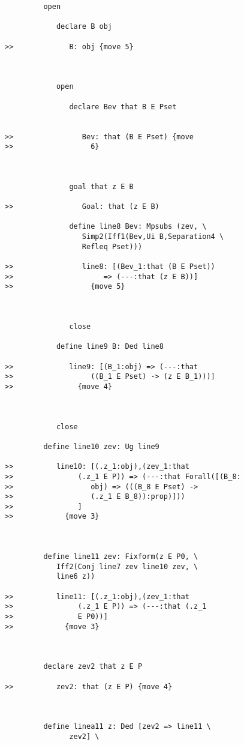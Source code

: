 \documentclass[12pt]{article}
\begin{document}
\begin{verbatim}
         open

            declare B obj

>>             B: obj {move 5}



            open

               declare Bev that B E Pset


>>                Bev: that (B E Pset) {move
>>                  6}



               goal that z E B

>>                Goal: that (z E B)

               define line8 Bev: Mpsubs (zev, \
                  Simp2(Iff1(Bev,Ui B,Separation4 \
                  Refleq Pset)))

>>                line8: [(Bev_1:that (B E Pset))
>>                     => (---:that (z E B))]
>>                  {move 5}



               close

            define line9 B: Ded line8

>>             line9: [(B_1:obj) => (---:that
>>                  ((B_1 E Pset) -> (z E B_1)))]
>>               {move 4}



            close

         define line10 zev: Ug line9

>>          line10: [(.z_1:obj),(zev_1:that
>>               (.z_1 E P)) => (---:that Forall([(B_8:
>>                  obj) => (((B_8 E Pset) ->
>>                  (.z_1 E B_8)):prop)]))
>>               ]
>>            {move 3}



         define line11 zev: Fixform(z E P0, \
            Iff2(Conj line7 zev line10 zev, \
            line6 z))

>>          line11: [(.z_1:obj),(zev_1:that
>>               (.z_1 E P)) => (---:that (.z_1
>>               E P0))]
>>            {move 3}



         declare zev2 that z E P

>>          zev2: that (z E P) {move 4}



         define linea11 z: Ded [zev2 => line11 \
               zev2] \
            




\end{verbatim}
\end{document}
